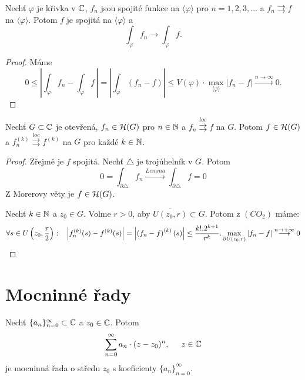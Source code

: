 \begin{lemma}
Nechť $\varphi$ je křivka v $\operatorname{\mathbb{C}}  $, $f_n$ jsou spojité funkce na $\langle\varphi\rangle$ pro $n=1,2,3,...$ a $f_n\rightrightarrows{f}$ na $\langle\varphi\rangle$. Potom $f$ je spojitá na $\langle\varphi\rangle$ a 
\[\int_\varphi{f_n}\longrightarrow\int_\varphi{f}.\]
\end{lemma}

\begin{proof}
Máme
\[0\leq\left\lvert{\int_\varphi{f_n}-\int_\varphi{f}}\, \right\lvert=
\left\lvert{\int_\varphi{(f_n-f)}}\right\lvert\leq{}
V(\varphi)\cdot\max_{\langle\varphi\rangle}{|f_n-f|}\overset{n\to\infty}{\longrightarrow}0.\]
\end{proof}

\begin{theorem}[Weierstrass]
Nechť $G\subset{\operatorname{\mathbb{C}}}$ je otevřená, $f_n\in\operatorname{\mathcal{H}} (G)$ pro $n\in\operatorname{\mathbb{N}}$ a $f_n\overset{loc}{\rightrightarrows}f$ na $G$. Potom $f\in\operatorname{\mathcal{H}} (G)$ a $f_n^{(k)}\overset{loc}{\rightrightarrows}f^{(k)}$ na $G$ pro každé $k\in\operatorname{\mathbb{N}}$.
\end{theorem}

\begin{proof}
 Zřejmě je $f$ spojitá. Nechť $\triangle$ je trojúhelník v $G$. Potom 
\[0=\int_{\partial\triangle}{f_n}\overset{Lemma}{\longrightarrow}
\int_{\partial\triangle}{f}=0\]
Z Morerovy věty je $f\in\operatorname{\mathcal{H}} (G)$.

 Nechť $k\in\operatorname{\mathbb{N}}$ a $z_0\in{G}$. Volme $r>0$, aby $\overline{U(z_0,r)}\subset{G}$. Potom z $(CO_2)$ máme:
\[\forall{s\in{U\left(z_0,\frac{r}{2}\right)}}:\hspace{3mm}
{\left\lvert{f_n^{(k)}(s)-f^{(k)}(s)}\right\lvert}=
\left\lvert{\left({f_n-f}\right)^{(k)}(s)}\right\lvert\leq
\frac{k!.2^{k+1}}{r^k}.\max_{\partial{U(z_0,r)}}{|f_n-f|}
\overset{n\to+\infty}{\longrightarrow}0\]
\end{proof}

\section{\texorpdfstring{Mocninné řady}{Mocninné rady}}

\begin{definition}
Nechť $\{a_n\}_{n=0}^\infty\subset\operatorname{\mathbb{C}}  $ a $z_0\in\operatorname{\mathbb{C}}  $. Potom 
\begin{equation}
\sum_{n=0}^\infty{a_n\cdot(z-z_0)^n}, \hspace{5mm} z\in\operatorname{\mathbb{C}}  
\label{eqn:rada}
\end{equation}
je mocninná řada o středu $z_0$ s koeficienty $\{a_n\}_{n=0}^\infty$.
\end{definition}

